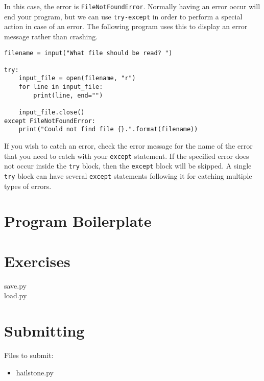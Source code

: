 \documentclass[11pt]{cselabheader}
\begin{document}
In this case, the error is \lstinline{FileNotFoundError}. Normally having an error occur will end your program, but we can use \lstinline{try-except} in order to perform a special action in case of an error. The following program uses this to display an error message rather than crashing.

\begin{lstlisting}[style=python]
filename = input("What file should be read? ")

try:
    input_file = open(filename, "r")
    for line in input_file:
        print(line, end="")

    input_file.close()
except FileNotFoundError:
    print("Could not find file {}.".format(filename))
\end{lstlisting}

If you wish to catch an error, check the error message for the name of the error that you need to catch with your \lstinline{except} statement. If the specified error does not occur inside the \lstinline{try} block, then the \lstinline{except} block will be skipped. A single \lstinline{try} block can have several \lstinline{except} statements following it for catching multiple types of errors.

\section{Program Boilerplate}




\section{Exercises}
\label{sec:ex}

\begin{description}
  \item[save.py]
  \item[load.py]
\end{description}

\section{Submitting}

Files to submit:
\begin{itemize}
  \item hailstone.py
\end{itemize}
\end{document}
